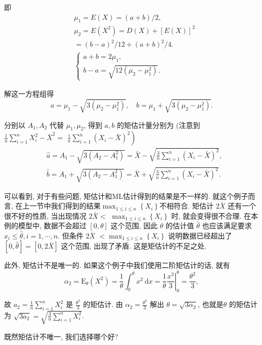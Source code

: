 \begin{solution}
    即
    $$
    \begin{aligned}
    & \mu_1=E(X)=(a+b) / 2, \\
    & \mu_2=E\left(X^2\right)=D(X)+[E(X)]^2 \\
    &=(b-a)^2 / 12+(a+b)^2 / 4 . \\
    &\left\{\begin{array}{l}
    a+b=2 \mu_1, \\
    b-a=\sqrt{12\left(\mu_2-\mu_1^2\right)} .
    \end{array}\right.
    \end{aligned}
    $$
    
    解这一方程组得
    $$
    a=\mu_1-\sqrt{3\left(\mu_2-\mu_1^2\right)}, \quad b=\mu_1+\sqrt{3\left(\mu_2-\mu_1^2\right)} .
    $$

    分别以 $A_1, A_2$ 代替 $\mu_1, \mu_2$, 得到 $a, b$ 的矩估计量分别为 (注意到 $\frac{1}{n} \sum_{i=1}^n X_i^2-\bar{X}^2=$ $\left.\frac{1}{n} \sum_{i=1}^n\left(X_i-\bar{X}\right)^2\right)$
$$
\begin{aligned}
& \hat{a}=A_1-\sqrt{3\left(A_2-A_1^2\right)}=\bar{X}-\sqrt{\frac{3}{n} \sum_{i=1}^n\left(X_i-\bar{X}\right)^2}, \\
& \hat{b}=A_1+\sqrt{3\left(A_2-A_1^2\right)}=\bar{X}+\sqrt{\frac{3}{n} \sum_{i=1}^n\left(X_i-\bar{X}\right)^2} .
\end{aligned}
$$
\end{solution}

可以看到, 对于有些问题, 矩估计和ML估计得到的结果是不一样的. 就这个例子而言, 在上一节中我们得到的结果$\max _{1 \leq i \leq n}\left\{X_i\right\}$不相符合. 矩估计 $2 \bar{X}$ 还有一个很不好的性质, 当出现情况 $2 \bar{X}<$ $\max _{1 \leq i \leq n}\left\{X_i\right\}$ 时, 就会变得很不合理. 在本例的模型中, 数据不会超过 $[0, \theta]$ 这个范围, 因此 $\theta$ 的估计值 $\hat{\theta}$ 也应该满足要求 $x_i \leq \hat{\theta}, i=1, \cdots, n$. 但条件 $2 \bar{X}$ $<\max _{1 \leq i \leq n}\left\{X_i\right\}$ 说明数据已经超出了 $[0, \hat{\theta}]=[0,2 \bar{X}]$ 这个范围, 出现了矛盾. 这是矩估计的不足之处.

此外, 矩估计不是唯一的. 如果这个例子中我们使用二阶矩估计的话, 就有
$$
\alpha_2=\mathrm{E}_\theta\left(X^2\right)=\frac{1}{\theta} \int_0^\theta x^2 \mathrm{~d} x=\left.\frac{1}{\theta} \frac{x^3}{3}\right|_0 ^\theta=\frac{\theta^2}{3},
$$

故 $a_2=\frac{1}{n} \sum_{i=1}^n X_i^2$ 是 $\frac{\theta^2}{3}$ 的矩估计. 由 $\alpha_2=\frac{\theta^2}{3}$ 解出 $\theta=\sqrt{3 \alpha_2}$, 也就是$\theta$ 的矩估计为 $\sqrt{3 a_2}=\sqrt{\frac{3}{n} \sum_{i=1}^n X_i^2}$.

既然矩估计不唯一, 我们选择哪个好? 




